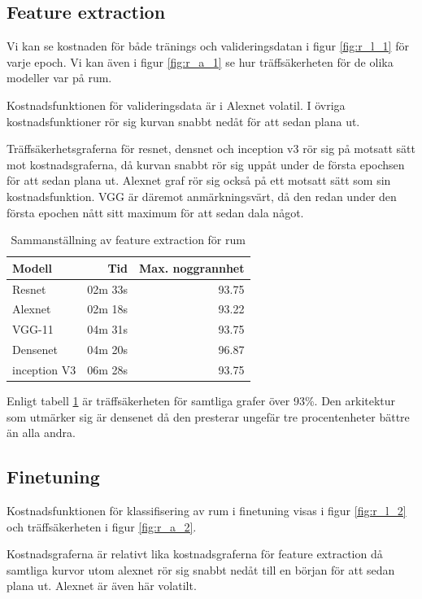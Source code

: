 \documentclass[]{kththesis}
\begin{document}
\subsection{Feature extraction}
Vi kan se kostnaden för både tränings och valideringsdatan i figur \ref{fig:r_l_1} för varje epoch. 
Vi kan även  i figur \ref{fig:r_a_1} se hur träffsäkerheten för de olika modeller var på rum.

Kostnadsfunktionen för valideringsdata är i Alexnet volatil. 
I övriga kostnadsfunktioner rör sig kurvan snabbt nedåt för att sedan plana ut.

Träffsäkerhetsgraferna för resnet, densnet och inception v3 rör sig på motsatt sätt mot kostnadsgraferna, då kurvan snabbt rör sig uppåt under de första epochsen för att sedan plana ut.
Alexnet graf rör sig också på ett motsatt sätt som sin kostnadsfunktion. 
VGG är däremot anmärkningsvärt, då den redan under den första epochen nått sitt maximum för att sedan dala något.


\begin{table}[!htbp]
  \centering
  \begin{tabular}{|l|r|r|}
    Modell & Tid & Max. noggrannhet \\ 
    \hline
    Resnet       & 02m 33s & 93.75 \\
    Alexnet      & 02m 18s & 93.22 \\
    VGG-11       & 04m 31s & 93.75 \\
    Densenet     & 04m 20s & 96.87 \\
    inception V3 & 06m 28s & 93.75 \\
  \end{tabular}
  \caption{Sammanställning av feature extraction för rum}
  \label{fig:sam_5}    
\end{table}

Enligt tabell \ref{fig:sam_5} är träffsäkerheten för samtliga grafer över 93\%.
Den arkitektur som utmärker sig är densenet då den presterar ungefär tre procentenheter bättre än alla andra.

\subsection{Finetuning}
Kostnadsfunktionen för klassifisering av rum i finetuning visas i figur \ref{fig:r_l_2} och träffsäkerheten i figur \ref{fig:r_a_2}.

Kostnadsgraferna är relativt lika kostnadsgraferna för feature extraction då samtliga kurvor utom alexnet rör sig snabbt nedåt till en början för att sedan plana ut.
Alexnet är även här volatilt.
\end{document}
